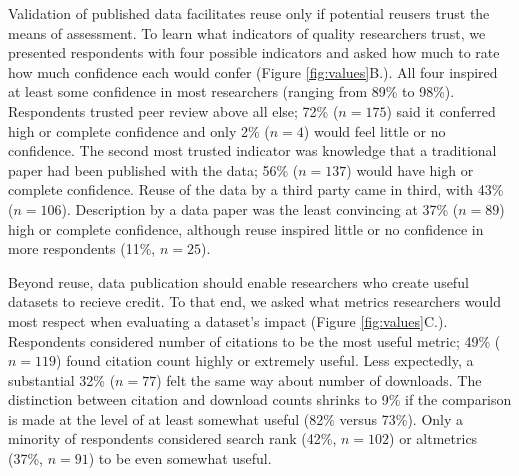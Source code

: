 \documentclass[10pt]{article}
\begin{document}
Validation of published data facilitates reuse only if potential reusers trust the means of assessment.
To learn what indicators of quality researchers trust, we presented respondents with four possible indicators and asked how much to rate how much confidence each would confer (Figure \ref{fig:values}B.).
All four inspired at least some confidence in most researchers (ranging from 89\% to 98\%).
Respondents trusted peer review above all else; 72\% ($n=175$) said it conferred high or complete confidence and only 2\% ($n=4$) would feel little or no confidence.
The second most trusted indicator was knowledge that a traditional paper had been published with the data; 56\% ($n=137$) would have high or complete confidence.
Reuse of the data by a third party came in third, with 43\% ($n=106$). 
Description by a data paper was the least convincing at 37\% ($n=89$) high or complete confidence, although reuse inspired little or no confidence in more respondents (11\%, $n=25$).

Beyond reuse, data publication should enable researchers who create useful datasets to recieve credit.
To that end, we asked what metrics researchers would most respect when evaluating a dataset's impact (Figure \ref{fig:values}C.).
Respondents considered number of citations to be the most useful metric; 49\% ($n=119$) found citation count highly or extremely useful. 
Less expectedly, a substantial 32\% ($n=77$) felt the same way about number of downloads.
The distinction between citation and download counts shrinks to 9\% if the comparison is made at the level of at least somewhat useful (82\% versus 73\%).
Only a minority of respondents considered search rank (42\%, $n=102$) or altmetrics (37\%, $n=91$) to be even somewhat useful.
\end{document}
